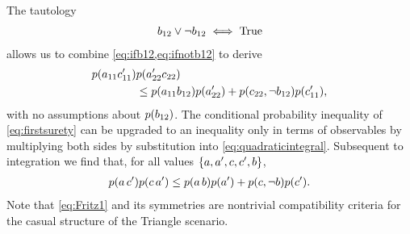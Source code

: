 The tautology
\begin{align*}
b_{12} \lor \lnot b_{12} \iff \mbox{True}
\end{align*}
allows us to combine \cref{eq:ifb12,eq:ifnotb12} to derive
\begin{align}\begin{split}\label{eq:firstsurety}
\p{a_{11} c'_{11}}&\p{a'_{22} c_{22}}
\\&\leq \p{a_{11} b_{12}}\p{a'_{22}}+\p{c_{22},\nb_{12}}\p{c'_{11}},
\end{split}\end{align}
with no assumptions about $\p{b_{12}}$.
The conditional probability inequality of \cref{eq:firstsurety} can be upgraded to an inequality only in terms of observables by multiplying both sides by substitution into \cref{eq:quadraticintegral}. Subsequent to integration we find that, 
for all values $\left\lbrace a,a',c,c',b\right\rbrace$,
\begin{align}\label{eq:Fritz1}
\p{a\, c'}\p{c\, a'}\leq \p{a\, b}\p{a'}+\p{c,\nb}\p{c'}.
\end{align}
Note that \cref{eq:Fritz1} and its symmetries are nontrivial compatibility criteria for the casual structure of the Triangle scenario. 

